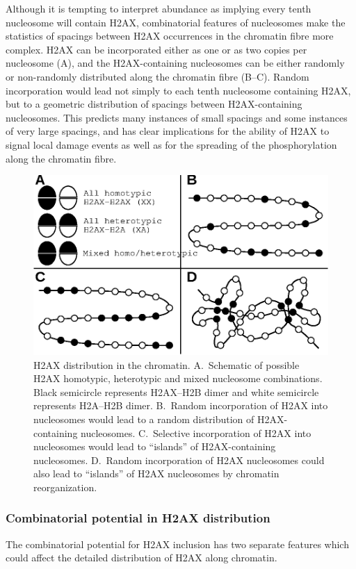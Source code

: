 Although it is tempting to interpret  abundance as implying every tenth nucleosome will contain
H2AX, combinatorial features of nucleosomes make the statistics of spacings between H2AX occurrences
in the chromatin fibre more complex. H2AX can be incorporated either as one or as two copies per
nucleosome (A), and the H2AX-containing nucleosomes can be either
randomly or non-randomly distributed along the chromatin fibre (B--C).
Random incorporation would lead not simply to each tenth nucleosome containing H2AX, but to a
geometric distribution of spacings between H2AX-containing nucleosomes. This predicts many instances
of small spacings and some instances of very large spacings, and has clear implications for the
ability of \textgamma H2AX to signal local damage events as well as for the spreading of the
phosphorylation along the chromatin fibre.

\begin{figure}
\includegraphics{Fig6}
\caption{H2AX distribution in the chromatin. A.~Schematic of possible H2AX homotypic, heterotypic and
mixed nucleosome combinations. Black semicircle represents H2AX--H2B dimer and white semicircle
represents H2A--H2B dimer. B.~Random incorporation of H2AX into nucleosomes would lead to a random
distribution of H2AX-containing nucleosomes. C.~Selective incorporation of H2AX into nucleosomes
would lead to ``islands'' of H2AX-containing nucleosomes. D.~Random incorporation of H2AX nucleosomes
could also lead to ``islands'' of H2AX nucleosomes by chromatin reorganization.}
\label{fig:h2ax-review:H2AX-distribution}
\end{figure}

\subsubsection{Combinatorial potential in H2AX distribution}
The combinatorial potential for H2AX inclusion has two separate features which could affect the
detailed distribution of H2AX along chromatin.

